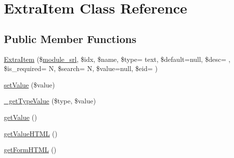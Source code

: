 \hypertarget{classExtraItem}{}\section{Extra\+Item Class Reference}
\label{classExtraItem}
\subsection*{Public Member Functions}
\begin{DoxyCompactItemize}
\item 
\hyperlink{classExtraItem_abdf34ec801688507ddbc1acd513d2f8d}{Extra\+Item} (\$\hyperlink{ko_8install_8php_a370bb6450fab1da3e0ed9f484a38b761}{module\+\_\+srl}, \$idx, \$name, \$type= \textquotesingle{}text\textquotesingle{}, \$default=null, \$desc= \textquotesingle{}\textquotesingle{}, \$is\+\_\+required= \textquotesingle{}N\textquotesingle{}, \$search= \textquotesingle{}N\textquotesingle{}, \$value=null, \$eid= \textquotesingle{}\textquotesingle{})
\item 
\hyperlink{classExtraItem_a6bec289dc0622bd882a36cb9b5680b03}{set\+Value} (\$value)
\item 
\hyperlink{classExtraItem_ac285a098cdd05b2c152b3d94c8cb95db}{\+\_\+get\+Type\+Value} (\$type, \$value)
\item 
\hyperlink{classExtraItem_a61ff542aa57144ac9e8d20d40f426486}{get\+Value} ()
\item 
\hyperlink{classExtraItem_a7784f081919e81e4a41ab0c250d6ca52}{get\+Value\+H\+T\+M\+L} ()
\item 
\hyperlink{classExtraItem_aaedac8843abdf391e8f4d22704606898}{get\+Form\+H\+T\+M\+L} ()
\end{DoxyCompactItemize}

